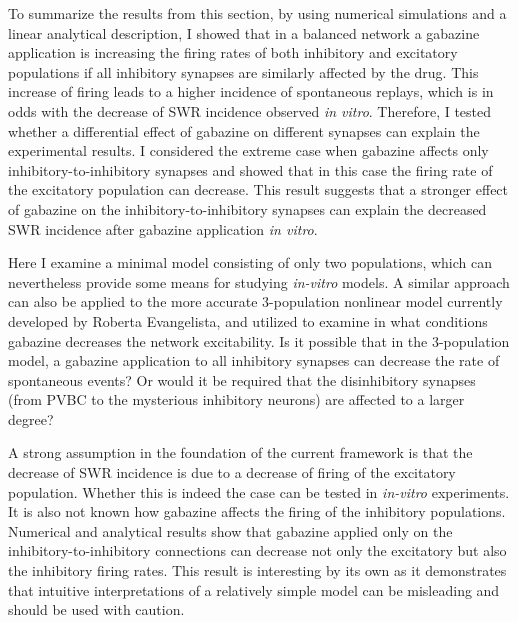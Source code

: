     To summarize the results from this section, by using numerical simulations
    and a linear analytical description, I showed that in a balanced network a
    gabazine application is increasing the firing rates of both inhibitory and
    excitatory populations if all inhibitory synapses are similarly affected by
    the drug. This increase of firing leads to a higher incidence of
    spontaneous replays, which is in odds with the decrease of SWR incidence
    observed {\textit{in vitro}}. Therefore, I tested whether a differential
    effect of gabazine on different synapses can explain the experimental
    results. I considered the extreme case when gabazine affects only
    inhibitory-to-inhibitory synapses and showed that in this case the firing
    rate of the excitatory population can decrease. This result suggests that a
    stronger effect of gabazine on the inhibitory-to-inhibitory synapses can
    explain the decreased SWR incidence after gabazine application {\textit{in
    vitro}}.
    
    Here I examine a minimal model consisting of only two populations, which
    can nevertheless provide some means for studying \textit{in-vitro} models.
    A similar approach can also be applied to the more accurate 3-population
    nonlinear model currently developed by Roberta Evangelista, and utilized to
    examine in what conditions gabazine decreases the network excitability. Is
    it possible that in the 3-population model, a gabazine application to all
    inhibitory synapses can decrease the rate of spontaneous events? Or would
    it be required that the disinhibitory synapses (from PVBC to the mysterious
    inhibitory neurons) are affected to a larger degree?

    A strong assumption in the foundation of the current framework is that the
    decrease of SWR incidence is due to a decrease of firing of the excitatory
    population. Whether this is indeed the case can be tested in
    \textit{in-vitro} experiments. It is also not known how gabazine affects
    the firing of the inhibitory populations. Numerical and analytical results
    show that gabazine applied only on the inhibitory-to-inhibitory connections
    can decrease not only the excitatory but also the inhibitory firing rates.
    This result is interesting by its own as it demonstrates that intuitive
    interpretations of a relatively simple model can be misleading and should
    be used with caution.
    
